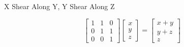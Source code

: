 \documentclass{beamer}
\begin{document}
\begin{frame}{X Shear Along Y, Y Shear Along Z}

\[ \left[ \begin{array}{ccc} 1 & 1 & 0\\ 0 & 1 & 1 \\ 0 & 0 & 1 \end{array} \right] \left[ \begin{array}{c} x \\ y \\ z \end{array} \right] =  \left[ \begin{array}{c} x + y \\ y + z \\ z \end{array} \right] \]

\begin{figure}[t]
    \captionsetup[subfloat]{labelformat=empty}
	\centering

\end{figure}

\end{frame}
\end{document}

